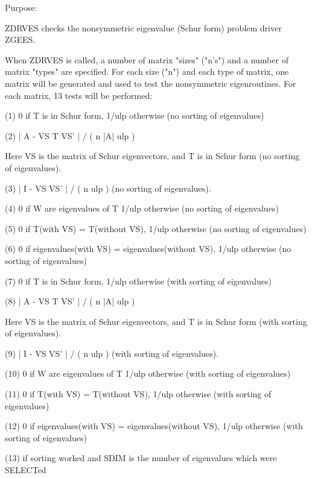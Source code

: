 \begin{DoxyParagraph}{Purpose\+: }
\begin{DoxyVerb}    ZDRVES checks the nonsymmetric eigenvalue (Schur form) problem
    driver ZGEES.

    When ZDRVES is called, a number of matrix "sizes" ("n's") and a
    number of matrix "types" are specified.  For each size ("n")
    and each type of matrix, one matrix will be generated and used
    to test the nonsymmetric eigenroutines.  For each matrix, 13
    tests will be performed:

    (1)     0 if T is in Schur form, 1/ulp otherwise
           (no sorting of eigenvalues)

    (2)     | A - VS T VS' | / ( n |A| ulp )

      Here VS is the matrix of Schur eigenvectors, and T is in Schur
      form  (no sorting of eigenvalues).

    (3)     | I - VS VS' | / ( n ulp ) (no sorting of eigenvalues).

    (4)     0     if W are eigenvalues of T
            1/ulp otherwise
            (no sorting of eigenvalues)

    (5)     0     if T(with VS) = T(without VS),
            1/ulp otherwise
            (no sorting of eigenvalues)

    (6)     0     if eigenvalues(with VS) = eigenvalues(without VS),
            1/ulp otherwise
            (no sorting of eigenvalues)

    (7)     0 if T is in Schur form, 1/ulp otherwise
            (with sorting of eigenvalues)

    (8)     | A - VS T VS' | / ( n |A| ulp )

      Here VS is the matrix of Schur eigenvectors, and T is in Schur
      form  (with sorting of eigenvalues).

    (9)     | I - VS VS' | / ( n ulp ) (with sorting of eigenvalues).

    (10)    0     if W are eigenvalues of T
            1/ulp otherwise
            (with sorting of eigenvalues)

    (11)    0     if T(with VS) = T(without VS),
            1/ulp otherwise
            (with sorting of eigenvalues)

    (12)    0     if eigenvalues(with VS) = eigenvalues(without VS),
            1/ulp otherwise
            (with sorting of eigenvalues)

    (13)    if sorting worked and SDIM is the number of
            eigenvalues which were SELECTed


\end{DoxyVerb}
\end{DoxyParagraph}

